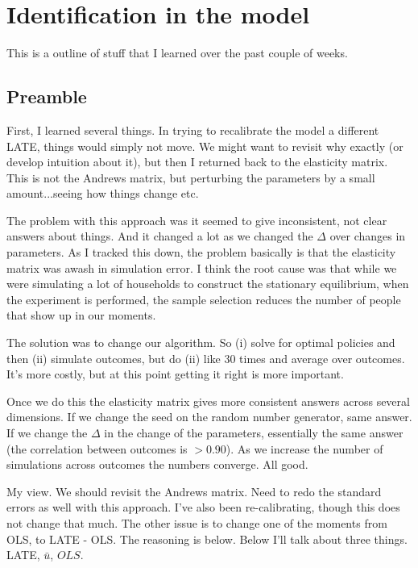 \documentclass[pdftex,11pt]{article}
\begin{document}
\section{Identification in the model}

This is a outline of stuff that I learned over the past couple of weeks.

\subsection{Preamble}

First, I learned several things. In trying to recalibrate the model a different LATE, things would simply not move. We might want to revisit why exactly (or develop intuition about it), but then I returned back to the elasticity matrix. This is not the Andrews matrix, but perturbing the parameters by a small amount...seeing how things change etc.

The problem with this approach was it seemed to give inconsistent, not clear answers about things. And it changed a lot as we changed the $\Delta$  over changes in parameters. As I tracked this down, the problem basically is  that the elasticity matrix was awash in simulation error. I think the root cause was that while we were simulating a lot of households to construct the stationary equilibrium, when the experiment is performed, the sample selection reduces the number of people that show up in our moments.

The solution was to change our algorithm. So (i) solve for optimal policies and then (ii) simulate outcomes, but do (ii) like 30 times and average over outcomes. It's more costly, but at this point getting it right is more important.

Once we do this the elasticity matrix gives more consistent answers across several dimensions. If we change the seed on the random number generator, same answer. If we change the $\Delta$ in the change of the parameters, essentially the same answer (the correlation between outcomes is $> 0.90$). As we increase the number of simulations across outcomes the numbers converge. All good.

My view. We should revisit the Andrews matrix. Need to redo the standard errors as well with this approach. I've also been re-calibrating, though this does not change that much. The other issue is to change one of the moments from OLS, to LATE - OLS. The reasoning is below.  Below I'll talk about three things. LATE, $\bar u$, $OLS$.
\end{document}
